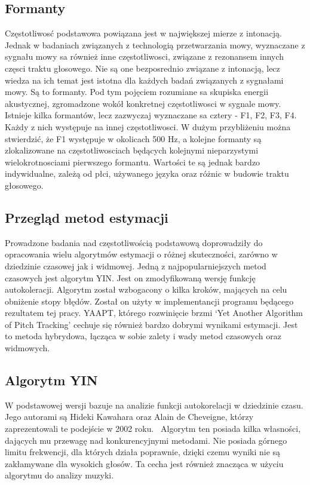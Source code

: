 \documentclass[a4paper,12 pt]{report}
\begin{document}
\subsection{Formanty}
Częstotliwosć podstawowa powiązana jest w największej mierze z intonacją. Jednak w badaniach związanych z technologią przetwarzania mowy, wyznaczane z sygnału mowy sa również inne częstotliwosci, związane z rezonansem innych częsci traktu głosowego. Nie są one bezposrednio związane z intonacją, lecz wiedza na ich temat jest istotna dla każdych badań związanych z sygnałami mowy. Są to formanty. Pod tym pojęciem rozumiane sa skupiska energii akustycznej, zgromadzone wokół konkretnej częstotliwosci w sygnale mowy.~\cite{formant} Istnieje kilka formantów, lecz zazwyczaj wyznaczane sa cztery - F1, F2, F3, F4. Każdy z nich występuje na innej częstotliwosci. W dużym przybliżeniu można stwierdzić, że F1 występuje w okolicach 500 Hz, a kolejne formanty są zlokalizowane na częstotliwosciach będących kolejnymi nieparzystymi wielokrotnosciami pierwszego formantu. Wartości te są jednak bardzo indywidualne, zależą od płci, używanego języka oraz różnic w budowie traktu głosowego.
\subsection{Przegląd metod estymacji}
Prowadzone badania nad częstotliwością podstawową doprowadziły do opracowania wielu algorytmów estymacji o różnej skuteczności, zarówno w dziedzinie czasowej jak i widmowej.
Jedną z najpopularniejszych metod czasowych jest algorytm YIN. Jest on zmodyfikowaną wersję funkcję autokoleracji. Algorytm został wzbogacony o kilka kroków, mających na celu obniżenie stopy błędów. Został on użyty w implementancji programu będącego rezultatem tej pracy.
YAAPT, którego rozwinięcie brzmi `Yet Another Algorithm of Pitch Tracking'  cechuje się również bardzo dobrymi wynikami estymacji. Jest to metoda hybrydowa, łącząca w sobie zalety i wady metod czasowych oraz widmowych.
 
\subsection{Algorytm YIN}

W podstawowej wersji bazuje na analizie funkcji autokorelacji w dziedzinie czasu. Jego autorami są Hideki Kawahara oraz Alain de Cheveigne, którzy zaprezentowali te podejście w 2002 roku.~\cite{YIN} Algorytm ten posiada kilka własności, dających mu przewagę nad konkurencyjnymi metodami. Nie posiada górnego limitu frekwencji, dla których działa poprawnie, dzięki czemu wyniki nie są zakłamywane dla wysokich głosów. Ta cecha jest również znacząca w użyciu algorytmu do analizy muzyki. 
\end{document}
